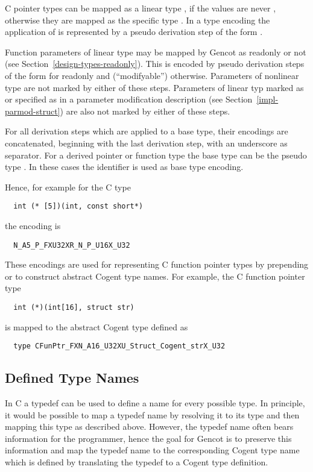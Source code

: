 C pointer types can be mapped as a linear type , if the values are never , otherwise they are mapped
as the specific type . In a type encoding the application of  is represented by
a pseudo derivation step of the form .

Function parameters of linear type may be mapped by Gencot as readonly or not (see Section~\ref{design-types-readonly}). 
This is encoded by pseudo derivation steps of the form  for readonly and  (``modifyable'')
otherwise. Parameters of nonlinear type are not marked by either of these steps. Parameters of linear typ marked as 
 or specified as  in a parameter modification description (see Section~\ref{impl-parmod-struct}) are also not
marked by either of these steps.

For all derivation steps which are applied to a base type, their encodings are concatenated, beginning with the 
last derivation step, with an underscore \code{\_} as separator. For a derived pointer or 
function type the base type can be the pseudo type . In these cases the identifier  is
used as base type encoding.

Hence, for example for the C type
\begin{verbatim}
  int (* [5])(int, const short*)
\end{verbatim}
the encoding is
\begin{verbatim}
  N_A5_P_FXU32XR_N_P_U16X_U32
\end{verbatim}

These encodings are used for representing C function pointer types by prepending  or 
to construct abstract Cogent type names. For example, the C function pointer type
\begin{verbatim}
  int (*)(int[16], struct str)
\end{verbatim}
is mapped to the abstract Cogent type defined as
\begin{verbatim}
  type CFunPtr_FXN_A16_U32XU_Struct_Cogent_strX_U32
\end{verbatim}

\subsection{Defined Type Names}
\label{design-types-typedef}

In C a typedef can be used to define a name for every possible type. In principle, it would be possible to
map a typedef name by resolving it to its type and then mapping this type as described above. However, the
typedef name often bears information for the programmer, hence the goal for Gencot is to preserve this information
and map the typedef name to the corresponding Cogent type name which is defined by translating the typedef
to a Cogent type definition.

